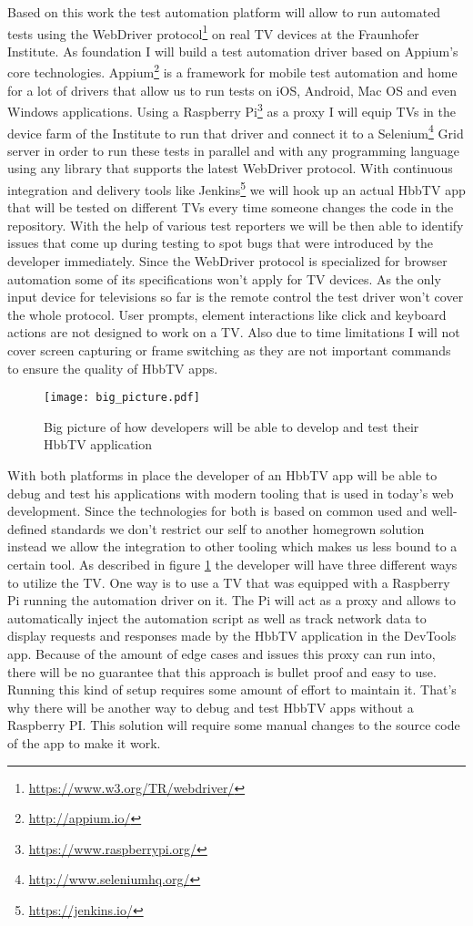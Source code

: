 Based on this work the test automation platform will allow to run automated tests using the WebDriver protocol\footnote{\url{https://www.w3.org/TR/webdriver/}} on real TV devices at the Fraunhofer Institute. As foundation I will build a test automation driver based on Appium's core technologies. Appium\footnote{\url{http://appium.io/}} is a framework for mobile test automation and home for a lot of drivers that allow us to run tests on iOS, Android, Mac OS and even Windows applications. Using a Raspberry Pi\footnote{\url{https://www.raspberrypi.org/}} as a proxy I will equip TVs in the device farm of the Institute to run that driver and connect it to a Selenium\footnote{\url{http://www.seleniumhq.org/}} Grid server in order to run these tests in parallel and with any programming language using any library that supports the latest WebDriver protocol. With continuous integration and delivery tools like Jenkins\footnote{\url{https://jenkins.io/}} we will hook up an actual HbbTV app that will be tested on different TVs every time someone changes the code in the repository. With the help of various test reporters we will be then able to identify issues that come up during testing to spot bugs that were introduced by the developer immediately. Since the WebDriver protocol is specialized for browser automation some of its specifications won't apply for TV devices. As the only input device for televisions so far is the remote control the test driver won't cover the whole protocol. User prompts, element interactions like click and keyboard actions are not designed to work on a TV. Also due to time limitations I will not cover screen capturing or frame switching as they are not important commands to ensure the quality of HbbTV apps.

\begin{figure}[htb]
  \centering
  \texttt{[image: big\_picture.pdf]}
  \caption{Big picture of how developers will be able to develop and test their HbbTV application}\label{fig:bigpicture}
\end{figure}

With both platforms in place the developer of an HbbTV app will be able to debug and test his applications with modern tooling that is used in today's web development. Since the technologies for both is based on common used and well-defined standards we don't restrict our self to another homegrown solution instead we allow the integration to other tooling which makes us less bound to a certain tool. As described in figure \ref{fig:bigpicture} the developer will have three different ways to utilize the TV. One way is to use a TV that was equipped with a Raspberry Pi running the automation driver on it. The Pi will act as a proxy and allows to automatically inject the automation script as well as track network data to display requests and responses made by the HbbTV application in the DevTools app. Because of the amount of edge cases and issues this proxy can run into, there will be no guarantee that this approach is bullet proof and easy to use. Running this kind of setup requires some amount of effort to maintain it. That's why there will be another way to debug and test HbbTV apps without a Raspberry PI. This solution will require some manual changes to the source code of the app to make it work.

